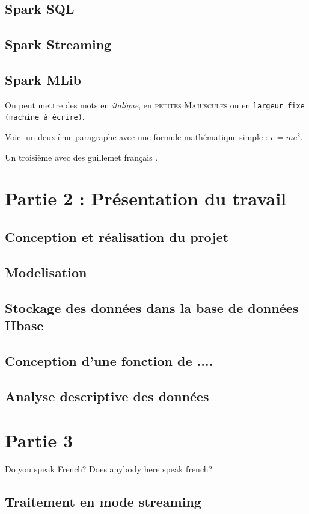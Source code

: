 \subsection{Spark SQL}
\subsection{Spark Streaming}
\subsection{Spark MLib}
On peut mettre des mots en \emph{italique}, 
en \textsc{petites Majuscules} ou 
en \texttt{largeur fixe (machine à écrire)}.

Voici un deuxième paragraphe avec une formule mathématique simple : $e = mc^2$.

Un troisième avec des \og guillemet français \fg{}.
\section{Partie 2 : Présentation du travail }
\subsection{Conception et réalisation du projet}
\subsection{Modelisation}
\subsection {Stockage des données dans la base de données Hbase}
\subsection{Conception d'une fonction de .... }
\subsection{Analyse descriptive des données}

\section {Partie 3}


\foreignlanguage{english}{Do you speak French? Does anybody here speak french?}


\subsection{Traitement en mode streaming}
